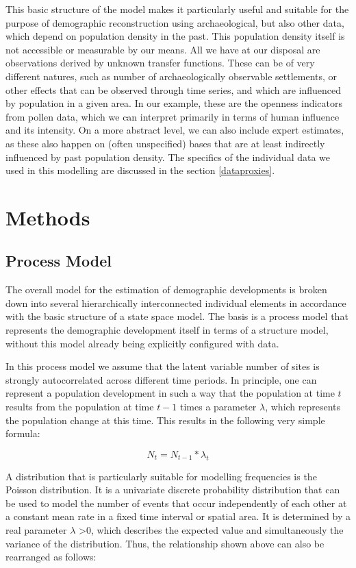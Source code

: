 \documentclass[
]{article}
\begin{document}
This basic structure of the model makes it particularly useful and suitable for the purpose of demographic reconstruction using archaeological, but also other data, which depend on population density in the past. This population density itself is not accessible or measurable by our means. All we have at our disposal are observations derived by unknown transfer functions. These can be of very different natures, such as number of archaeologically observable settlements, or other effects that can be observed through time series, and which are influenced by population in a given area. In our example, these are the openness indicators from pollen data, which we can interpret primarily in terms of human influence and its intensity. On a more abstract level, we can also include expert estimates, as these also happen on (often unspecified) bases that are at least indirectly influenced by past population density. The specifics of the individual data we used in this modelling are discussed in the section \ref{dataproxies}.

\hypertarget{methods}{%
\section{Methods}\label{methods}}

\hypertarget{process-model}{%
\subsection{Process Model}\label{process-model}}

The overall model for the estimation of demographic developments is broken down into several hierarchically interconnected individual elements in accordance with the basic structure of a state space model. The basis is a process model that represents the demographic development itself in terms of a structure model, without this model already being explicitly configured with data.

In this process model we assume that the latent variable number of sites is strongly autocorrelated across different time periods. In principle, one can represent a population development in such a way that the population at time \(t\) results from the population at time \(t-1\) times a parameter \(\lambda\), which represents the population change at this time. This results in the following very simple formula:

\[
N_t = N_{t-1} * \lambda_t
\]

A distribution that is particularly suitable for modelling frequencies is the Poisson distribution. It is a univariate discrete probability distribution that can be used to model the number of events that occur independently of each other at a constant mean rate in a fixed time interval or spatial area. It is determined by a real parameter \(\lambda\) \textgreater0, which describes the expected value and simultaneously the variance of the distribution. Thus, the relationship shown above can also be rearranged as follows:
\end{document}

